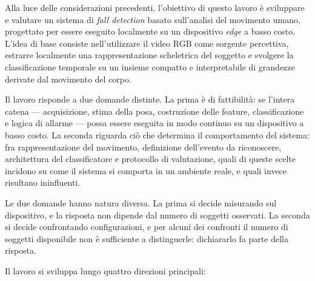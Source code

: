 Alla luce delle considerazioni precedenti, l'obiettivo di questo lavoro è
sviluppare e valutare un sistema di \emph{fall detection} basato sull'analisi
del movimento umano, progettato per essere eseguito localmente su un
dispositivo \emph{edge} a basso costo. L'idea di base consiste
nell'utilizzare il video RGB come sorgente percettiva, estrarre localmente
una rappresentazione scheletrica del soggetto e svolgere la classificazione
temporale su un insieme compatto e interpretabile di grandezze derivate dal
movimento del corpo.

Il lavoro risponde a due domande distinte. La prima è di fattibilità: se
l'intera catena --- acquisizione, stima della posa, costruzione delle
feature, classificazione e logica di allarme --- possa essere eseguita in
modo continuo su un dispositivo a basso costo. La seconda riguarda ciò che
determina il comportamento del sistema: fra rappresentazione del movimento,
definizione dell'evento da riconoscere, architettura del classificatore e
protocollo di valutazione, quali di queste scelte incidono su come il sistema
si comporta in un ambiente reale, e quali invece risultano ininfluenti.

Le due domande hanno natura diversa. La prima si decide misurando sul
dispositivo, e la risposta non dipende dal numero di soggetti osservati. La
seconda si decide confrontando configurazioni, e per alcuni dei confronti il
numero di soggetti disponibile non è sufficiente a distinguerle: dichiararlo
fa parte della risposta.

Il lavoro si sviluppa lungo quattro direzioni principali:

